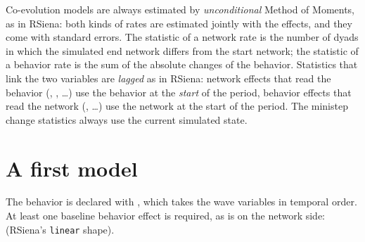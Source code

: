 Co-evolution models are always estimated by \emph{unconditional} Method of Moments, as in RSiena: both kinds of rates are estimated jointly with the effects, and they come with standard errors. The statistic of a network rate is the number of dyads in which the simulated end network differs from the start network; the statistic of a behavior rate is the sum of the absolute changes of the behavior. Statistics that link the two variables are \emph{lagged} as in RSiena: network effects that read the behavior (, , \dots) use the behavior at the \emph{start} of the period, behavior effects that read the network (, \dots) use the network at the start of the period. The ministep change statistics always use the current simulated state.

\section{A first model}

The behavior is declared with , which takes the wave variables in temporal order. At least one baseline behavior effect is required, as  is on the network side:  (RSiena's \texttt{linear} shape).

